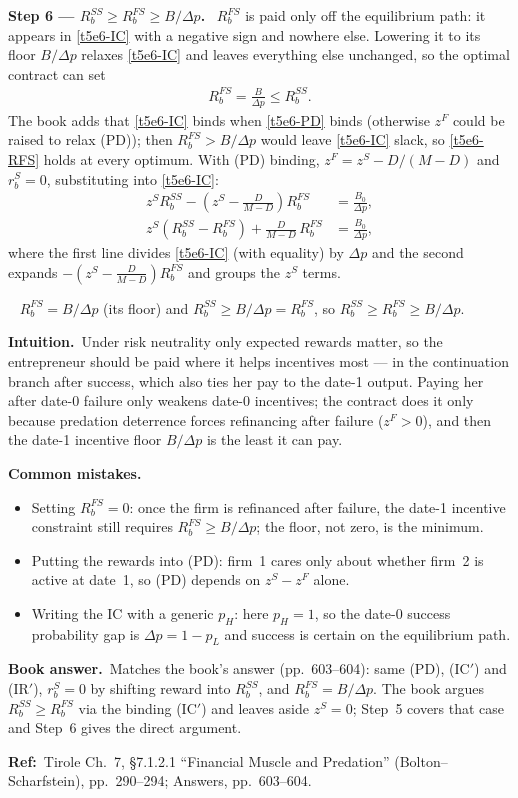 \documentclass[11pt,a4paper]{article}
\newcommand{\step}[2]{\par\medskip\noindent\textbf{Step #1 --- #2.}~}
\newcommand{\intuition}{\par\medskip\noindent\textbf{Intuition.}~}
\newcommand{\bookans}{\par\medskip\noindent\textbf{Book answer.}~}
\newcommand{\refbib}{\par\smallskip\noindent\textbf{Ref:}~}
\newcommand{\answer}[1]{\par\smallskip\noindent\fbox{\textbf{Answer #1.}}~}
\newcommand{\pitfalls}{\par\medskip\noindent\textbf{Common mistakes.}}
\begin{document}
\step{6}{$R_b^{SS}\geq R_b^{FS}\geq B/\Delta p$} $R_b^{FS}$ is paid only off the equilibrium path:
it appears in \eqref{t5e6-IC} with a negative sign and nowhere else. Lowering it to its floor
$B/\Delta p$ relaxes \eqref{t5e6-IC} and leaves everything else unchanged, so the optimal contract
can set
\begin{align}
  R_b^{FS} = \frac{B}{\Delta p} \leq R_b^{SS}. \label{t5e6-RFS}
\end{align}
The book adds that \eqref{t5e6-IC} binds when \eqref{t5e6-PD} binds (otherwise $z^F$ could be
raised to relax (PD)); then $R_b^{FS}>B/\Delta p$ would leave \eqref{t5e6-IC} slack, so \eqref{t5e6-RFS}
holds at every optimum. With (PD) binding, $z^F=z^S-D/(M-D)$ and $r_b^S=0$, substituting into
\eqref{t5e6-IC}:
\begin{align}
  z^SR_b^{SS}-\left(z^S-\frac{D}{M-D}\right)R_b^{FS} &= \frac{B_0}{\Delta p}, \nonumber\\
  z^S(R_b^{SS}-R_b^{FS})+\frac{D}{M-D}\,R_b^{FS} &= \frac{B_0}{\Delta p}, \label{t5e6-ICbind}
\end{align}
where the first line divides \eqref{t5e6-IC} (with equality) by $\Delta p$ and the second expands
$-(z^S-\frac{D}{M-D})R_b^{FS}$ and groups the $z^S$ terms.

\answer{(ordering)} $R_b^{FS}=B/\Delta p$ (its floor) and $R_b^{SS}\ge B/\Delta p=R_b^{FS}$, so
$R_b^{SS}\ge R_b^{FS}\ge B/\Delta p$.

\intuition Under risk neutrality only expected rewards matter, so the entrepreneur should be paid
where it helps incentives most --- in the continuation branch after success, which also ties her pay
to the date-1 output. Paying her after date-0 failure only weakens date-0 incentives; the contract
does it only because predation deterrence forces refinancing after failure ($z^F>0$), and then the
date-1 incentive floor $B/\Delta p$ is the least it can pay.
\pitfalls
\begin{itemize}
  \item Setting $R_b^{FS}=0$: once the firm is refinanced after failure, the date-1 incentive constraint
        still requires $R_b^{FS}\ge B/\Delta p$; the floor, not zero, is the minimum.
  \item Putting the rewards into (PD): firm~1 cares only about whether firm~2 is active at date~1, so
        (PD) depends on $z^S-z^F$ alone.
  \item Writing the IC with a generic $p_H$: here $p_H=1$, so the date-0 success probability gap is
        $\Delta p=1-p_L$ and success is certain on the equilibrium path.
\end{itemize}
\bookans Matches the book's answer (pp.~603--604): same (PD), (IC$'$) and (IR$'$), $r_b^S=0$ by
shifting reward into $R_b^{SS}$, and $R_b^{FS}=B/\Delta p$. The book argues $R_b^{SS}\geq R_b^{FS}$ via
the binding (IC$'$) and leaves aside $z^S=0$; Step~5 covers that case and Step~6 gives the direct argument.
\refbib{Tirole Ch.~7, \S 7.1.2.1 ``Financial Muscle and Predation'' (Bolton--Scharfstein), pp.~290--294; Answers, pp.~603--604.}
\end{document}
